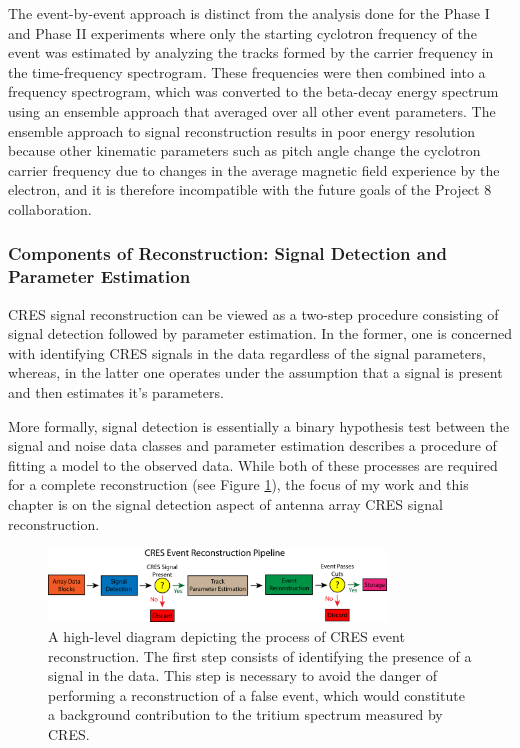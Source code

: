 The event-by-event approach is distinct from the analysis done for the Phase I and Phase II experiments where only the starting cyclotron frequency of the event was estimated by analyzing the tracks formed by the carrier frequency in the time-frequency spectrogram. These frequencies were then combined into a frequency spectrogram, which was converted to the beta-decay energy spectrum using an ensemble approach that averaged over all other event parameters. The ensemble approach to signal reconstruction results in poor energy resolution because other kinematic parameters such as pitch angle change the cyclotron carrier frequency due to changes in the average magnetic field experience by the electron, and it is therefore incompatible with the future goals of the Project 8 collaboration.

\subsubsection*{Components of Reconstruction: Signal Detection and Parameter Estimation}

CRES signal reconstruction can be viewed as a two-step procedure consisting of signal detection followed by parameter estimation. In the former, one is concerned with identifying CRES signals in the data regardless of the signal parameters, whereas, in the latter one operates under the assumption that a signal is present and then estimates it's parameters. 

More formally, signal detection is essentially a binary hypothesis test between the signal and noise data classes and parameter estimation describes a procedure of fitting a model to the observed data. While both of these processes are required for a complete reconstruction (see Figure \ref{fig:chap4-pter-pipeline}), the focus of my work and this chapter is on the signal detection aspect of antenna array CRES signal reconstruction.

\begin{figure}[htbp]
    \centering
    \includegraphics[width=0.8\textwidth]{figs/Chapter-4/230108_deepfilter_paper_event_reconstruction_pipeline.png}
    \caption{A high-level diagram depicting the process of CRES event reconstruction. The first step consists of identifying the presence of a signal in the data. This step is necessary to avoid the danger of performing a reconstruction of a false event, which would constitute a background contribution to the tritium spectrum measured by CRES.}
    \label{fig:chap4-pter-pipeline}
\end{figure}


